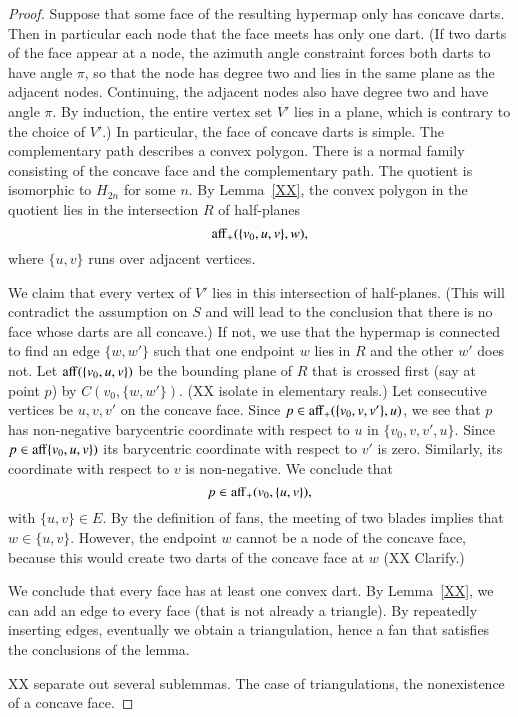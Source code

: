 \begin{proof}
Suppose that some face of the resulting hypermap only has concave darts.  Then
in particular each node that the face meets has only one dart.  (If two darts
of the face appear at a node, the azimuth angle constraint forces both darts to
have angle $\pi$, so that the node has degree two and lies in the same plane
as the adjacent nodes.  Continuing, the adjacent nodes also have degree two and
have angle $\pi$.  By induction, the entire vertex set $V'$ lies in a plane, which
is contrary to the choice of $V'$.)   In particular, the face of concave darts
is simple.   The complementary path describes a convex polygon.  There
is a normal family consisting of the concave face and the complementary path.
The quotient is isomorphic to $H_{2n}$ for some $n$.  By Lemma~\ref{XX}, the
convex polygon in the quotient lies in the intersection $R$ of half-planes
$$
{\operatorname{aff}}_+(\{v_0,u,v\},w),
$$
where $\{u,v\}$ runs over adjacent vertices.  

We claim that every vertex of $V'$ lies in this intersection of half-planes.
(This will contradict the assumption on $S$ and will lead to the conclusion that
there is no face whose darts are all concave.)
If not, we use that the hypermap is connected to find an edge $\{w,w'\}$ such
that one endpoint $w$ lies in $R$ and the other $w'$ does not.  
Let ${\operatorname{aff}}(\{v_0,u,v\})$ be the bounding plane of $R$ that 
is crossed first (say at point $p$) by
$C(v_0,\{w,w'\})$.  (XX isolate in elementary reals.)  
Let consecutive vertices be $u,v,v'$ on the concave face.  Since
$p\in {\operatorname{aff}}_+(\{v_0,v,v'\},u)$, we see that $p$ has non-negative barycentric
coordinate with respect to $u$ in $\{v_0,v,v',u\}$.  Since $p\in {\operatorname{aff}}\{v_0,u,v\})$
its barycentric coordinate with respect to $v'$ is zero.  Similarly, its
coordinate with respect to $v$ is non-negative.  We conclude that 
  $$p\in {\operatorname{aff}}_+(v_0,\{u,v\}),$$
with $\{u,v\}\in E$.  By the definition of fans, the meeting of two
blades implies that $w\in\{u,v\}$.
However, the endpoint $w$ cannot be a node of the concave face, because this would
create two darts of the concave face at $w$ (XX Clarify.)

We conclude that every face has at least one convex dart.  By Lemma~\ref{XX},
we can add an edge to every face (that is not already a triangle).  By repeatedly
inserting edges, eventually we obtain a triangulation, hence a fan
that satisfies the conclusions of the lemma.

XX separate out several sublemmas.  The case of triangulations, the nonexistence
of a concave face.


\end{proof}

